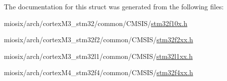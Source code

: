 The documentation for this struct was generated from the following files\-:\begin{DoxyCompactItemize}
\item 
miosix/arch/cortex\-M3\-\_\-stm32/common/\-C\-M\-S\-I\-S/\hyperlink{stm32f10x_8h}{stm32f10x.\-h}\item 
miosix/arch/cortex\-M3\-\_\-stm32f2/common/\-C\-M\-S\-I\-S/\hyperlink{stm32f2xx_8h}{stm32f2xx.\-h}\item 
miosix/arch/cortex\-M3\-\_\-stm32l1/common/\-C\-M\-S\-I\-S/\hyperlink{stm32l1xx_8h}{stm32l1xx.\-h}\item 
miosix/arch/cortex\-M4\-\_\-stm32f4/common/\-C\-M\-S\-I\-S/\hyperlink{stm32f4xx_8h}{stm32f4xx.\-h}\end{DoxyCompactItemize}
